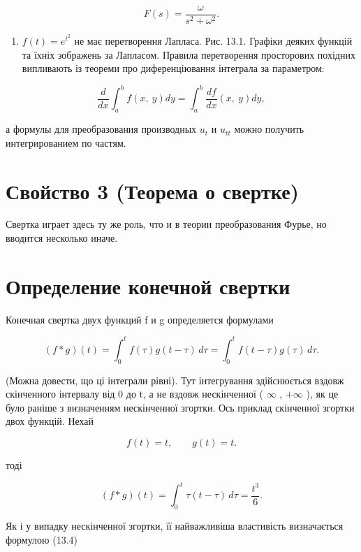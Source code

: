 \documentclass[
  ukrainian,
]{article}
\providecommand{\tightlist}{%
  \setlength{\itemsep}{0pt}\setlength{\parskip}{0pt}}
\begin{document}
\[
F(s)=\frac{\omega}{s^2+\omega^2}.
\]

\begin{enumerate}
\def\labelenumi{\arabic{enumi}.}
\setcounter{enumi}{3}
\tightlist
\item
  \(f(t)=e^{t^2}\) не має перетворення Лапласа. Рис. 13.1. Графіки
  деяких функцій та їхніх зображень за Лапласом. Правила перетворення
  просторових похідних випливають із теореми про диференціювання
  інтеграла за параметром:
\end{enumerate}

\[
\frac{d}{dx}\int_{a}^{b}f\left(x,\ y\right)dy=\int_{a}^{b}\frac{df}{dx}\left(x,\ y\right)dy,
\]

а формулы для преобразования производных \(u_t\) и \(u_{tt}\) можно
получить интегрированием по частям.

\section{Свойство 3 (Теорема о
свертке)}\label{ux441ux432ux43eux439ux441ux442ux432ux43e-3-ux442ux435ux43eux440ux435ux43cux430-ux43e-ux441ux432ux435ux440ux442ux43aux435}

Свертка играет здесь ту же роль, что и в теории преобразования Фурье, но
вводится несколько иначе.

\section{Определение конечной
свертки}\label{ux43eux43fux440ux435ux434ux435ux43bux435ux43dux438ux435-ux43aux43eux43dux435ux447ux43dux43eux439-ux441ux432ux435ux440ux442ux43aux438}

Конечная свертка двух функций f и g определяется формулами

\[
(f * g)(t)
= \int_0^t f(\tau)g(t-\tau)\,d\tau
= \int_0^t f(t-\tau)g(\tau)\,d\tau.
\]

(Можна довести, що ці інтеграли рівні). Тут інтегрування здійснюється
вздовж скінченного інтервалу від 0 до t, а не вздовж нескінченної (
\(\infty\) , \(+\infty\) ), як це було раніше з визначенням нескінченної
згортки. Ось приклад скінченної згортки двох функцій. Нехай

\[
f(t)=t,\qquad g(t)=t.
\]

тоді

\[
(f * g)(t)=\int_0^t \tau(t-\tau)\,d\tau=\frac{t^3}{6}.
\]

Як і у випадку нескінченної згортки, її найважливіша властивість
визначається формулою (13.4)
\end{document}
